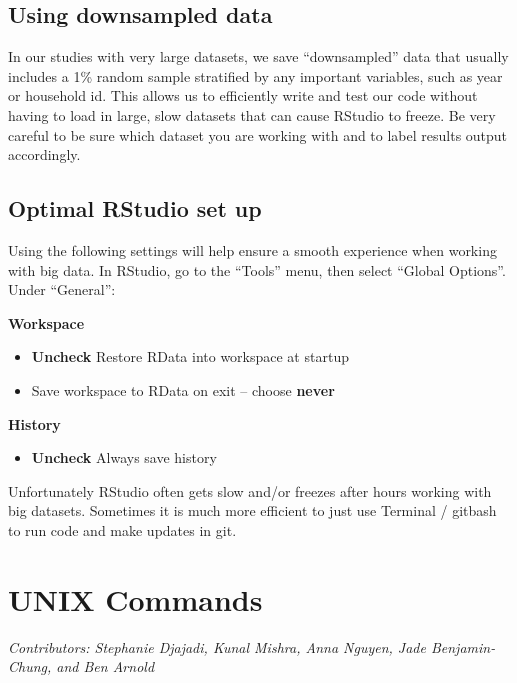 \documentclass[]{book}
\providecommand{\tightlist}{%
  \setlength{\itemsep}{0pt}\setlength{\parskip}{0pt}}
\begin{document}
\hypertarget{using-downsampled-data}{%
\section{Using downsampled data}\label{using-downsampled-data}}

In our studies with very large datasets, we save ``downsampled'' data that usually includes a 1\% random sample stratified by any important variables, such as year or household id. This allows us to efficiently write and test our code without having to load in large, slow datasets that can cause RStudio to freeze. Be very careful to be sure which dataset you are working with and to label results output accordingly.

\hypertarget{optimal-rstudio-set-up}{%
\section{Optimal RStudio set up}\label{optimal-rstudio-set-up}}

Using the following settings will help ensure a smooth experience when working with big data. In RStudio, go to the ``Tools'' menu, then select ``Global Options''. Under ``General'':

\textbf{Workspace}

\begin{itemize}
\tightlist
\item
  \textbf{Uncheck} Restore RData into workspace at startup
\item
  Save workspace to RData on exit -- choose \textbf{never}
\end{itemize}

\textbf{History}

\begin{itemize}
\tightlist
\item
  \textbf{Uncheck} Always save history
\end{itemize}

Unfortunately RStudio often gets slow and/or freezes after hours working with big datasets. Sometimes it is much more efficient to just use Terminal / gitbash to run code and make updates in git.

\hypertarget{unix}{%
\chapter{UNIX Commands}\label{unix}}

\emph{Contributors: Stephanie Djajadi, Kunal Mishra, Anna Nguyen, Jade Benjamin-Chung, and Ben Arnold}
\end{document}
